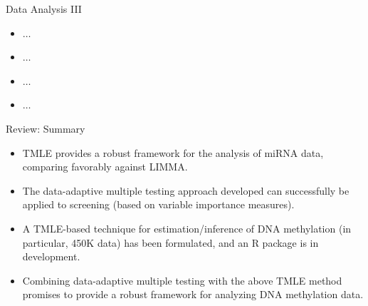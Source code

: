 \documentclass[12pt,t,handout]{beamer}
\begin{document}
\begin{frame}[c]{Data Analysis III}

\begin{center}
\begin{itemize}
  \itemsep12pt
  \item $\dots$
  \item $\dots$
  \item $\dots$
  \item $\dots$
\end{itemize}
\end{center}


\end{frame}



\begin{frame}[c]{Review: Summary}

\begin{center}
\begin{itemize}
  \itemsep12pt
  \item TMLE provides a robust framework for the analysis of miRNA data,
    comparing favorably against LIMMA.
  \item The data-adaptive multiple testing approach developed can successfully
    be applied to screening (based on variable importance measures).
  \item A TMLE-based technique for estimation/inference of DNA methylation
    (in particular, 450K data) has been formulated, and an R package is in
    development.
  \item Combining data-adaptive multiple testing with the above TMLE method
    promises to provide a robust framework for analyzing DNA methylation data.
\end{itemize}
\end{center}


\end{frame}
\end{document}
